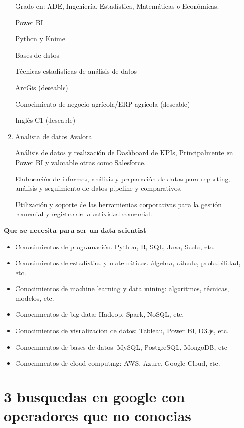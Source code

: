 \documentclass[12pt]{article}
\begin{document}
\begin{enumerate}
    Grado en: ADE, Ingeniería, Estadística, Matemáticas o Económicas.

    Power BI 
    
    Python y Knime 
    
    Bases de datos
    
    Técnicas estadísticas de análisis de datos 
    
    ArcGis (deseable)
    
    Conocimiento de negocio agrícola/ERP agrícola (deseable)
    
    Inglés C1 (deseable)

    \item \href{https://www.linkedin.com/jobs/view/4146379722}{Analista de datos Avalora}

    Análisis de datos y realización de Dashboard de KPIs, Principalmente en Power BI y valorable otras como Salesforce.

    Elaboración de informes, análisis y preparación de datos para reporting, análisis y seguimiento de datos pipeline y comparativos. 
    
    Utilización y soporte de las herramientas corporativas para la gestión comercial y registro de la actividad comercial. 
\end{enumerate}

\textbf{Que se necesita para ser un data scientist}

\begin{itemize}
    \item Conocimientos de programación: Python, R, SQL, Java, Scala, etc.
    \item Conocimientos de estadística y matemáticas: álgebra, cálculo, probabilidad, etc.
    \item Conocimientos de machine learning y data mining: algoritmos, técnicas, modelos, etc.
    \item Conocimientos de big data: Hadoop, Spark, NoSQL, etc.
    \item Conocimientos de visualización de datos: Tableau, Power BI, D3.js, etc.
    \item Conocimientos de bases de datos: MySQL, PostgreSQL, MongoDB, etc.
    \item Conocimientos de cloud computing: AWS, Azure, Google Cloud, etc.
\end{itemize}


\section{3 busquedas en google con operadores que no conocias}
\end{document}
